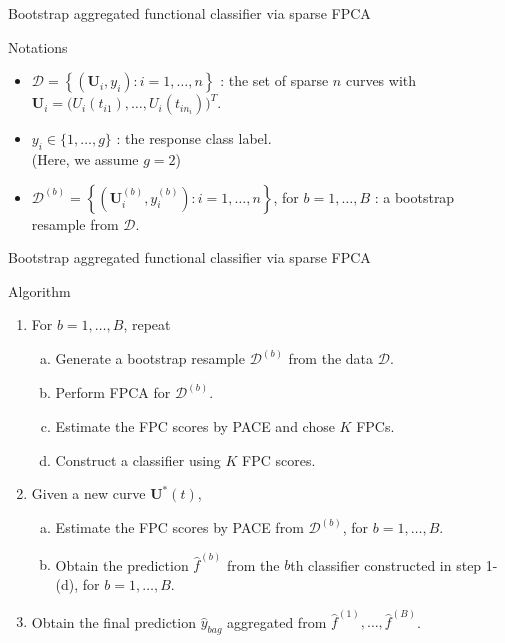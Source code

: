 \documentclass{beamer}
\def \bU { \mathbf{ U } }
\def \bD { \boldsymbol{\mathcal{D}} }
\begin{document}
\begin{frame}{Bootstrap aggregated functional classifier via sparse FPCA}
	\begin{block}{Notations}
		\begin{itemize}
			\item{
				$\bD = \left\{ \left( \bU_i, y_i \right) : i=1, \dots, n \right\}$ : the set of sparse $n$ curves with $\bU_i = \big( U_i(t_{i1}), \dots, U_i(t_{in_i}) \big)^T$.
			}
			\item{
				$y_i \in \{1, \ldots, g\}$ : the response class label. \\
				(Here, we assume $g=2$)
			}
			\item{
				$\bD^{(b)} = \left\{ \left( \bU^{(b)}_i, y^{(b)}_i \right) : i=1, \dots, n \right\}$, for $b=1,\dots,B$ : a bootstrap resample from $\bD$. 
			}
		\end{itemize}
	\end{block}
\end{frame}

\begin{frame}{Bootstrap aggregated functional classifier via sparse FPCA}
	\begin{block}{Algorithm}
		\begin{enumerate}
			\item For $b = 1, \dots, B$, repeat
			\begin{enumerate}[(a)]
				\item Generate a bootstrap resample $\bD^{(b)}$ from the data $\bD$.
				\item Perform FPCA for $\bD^{(b)}$.
				\item Estimate the FPC scores by PACE and chose $K$ FPCs.
				\item Construct a classifier using $K$ FPC scores.
			\end{enumerate}
			\item Given a new curve $\bU^*(t)$,
			\begin{enumerate}[(a)]
				\item Estimate the FPC scores by PACE from $\bD^{(b)}$, for $b = 1, \dots, B$.
				\item Obtain the prediction $\hat f^{(b)}$ from the $b$th classifier constructed in step 1-(d), for $b = 1, \dots, B$.
			\end{enumerate}
			
			\item Obtain the final prediction $\hat y_{bag}$ aggregated from $\hat f^{(1)}, \dots, \hat f^{(B)}$.
		\end{enumerate}
	\end{block}
\end{frame}
\end{document}
